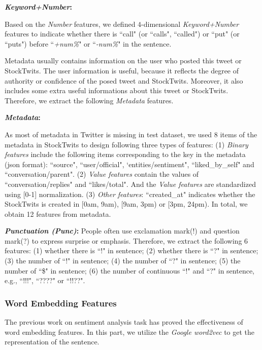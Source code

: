 \documentclass[11pt,a4paper]{article}
\begin{document}
\textbf{\emph{Keyword+Number}:}

Based on the \emph{Number} features, we defined $4$-dimensional \emph{Keyword+Number} features to indicate whether there is ``call" (or ``calls", ``called") or ``put" (or ``puts") before ``\emph{+num\%}" or ``\emph{-num\%}" in the sentence.

Metadata
usually contains information on the user who posted this tweet or StockTwits. The user information is useful, because it reflects the degree of authority or confidence of the posed tweet and StockTwits. Moreover, it also includes some extra useful informations about this tweet or StockTwits. Therefore, we extract the following \emph{Metadata} features.



\textbf{\emph{Metadata}:}

As most of metadata in Twitter is missing in test dataset, we used $8$ items of the metadata in StockTwits to design following three types of features: (1) \emph{Binary features} include the following items corresponding to the key in the metadata (json format): ``source", ``user/official",  `entities/sentiment", ``liked\_by\_self" and ``conversation/parent". (2) \emph{Value features} contain the values of ``conversation/replies" and ``likes/total". And the \emph{Value features} are standardized using [0-1] normalization. (3) \emph{Other features}: ``created\_at" indicates whether the StockTwits is created in [0am, 9am), [9am, 3pm) or [3pm,  24pm). In total, we obtain 12 features from metadata.


\textbf{\emph{Punctuation (Punc)}:}
People often use exclamation mark(!) and question mark(?) to express surprise or emphasis. Therefore, we extract the following 6 features: (1) whether there is ``!" in sentence; (2) whether there is ``?" in sentence; (3) the number of ``!"  in sentence; (4) the number of ``?"  in sentence; (5) the number of ``\$"  in sentence; (6) the number of continuous ``!" and ``?" in sentence, e.g., ``!!!", ``????" or ``!!??".


\subsubsection{Word Embedding Features}

The previous work \cite{zhang2016ecnu, jiang2016ecnu} on sentiment analysis task has proved the effectiveness of word embedding features. In this part, we utilize the \emph{Google word2vec} to get the representation of the sentence.
\end{document}

